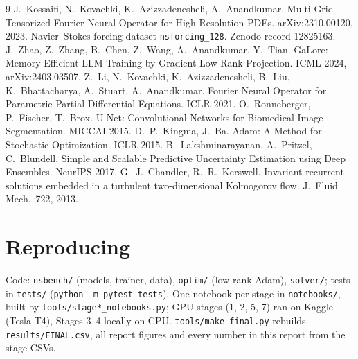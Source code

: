 \documentclass[11pt,a4paper]{article}
\begin{document}
\begin{thebibliography}{9}\small
{} J.~Kossaifi, N.~Kovachki, K.~Azizzadenesheli, A.~Anandkumar. Multi-Grid Tensorized Fourier Neural
Operator for High-Resolution PDEs. arXiv:2310.00120, 2023.
 Navier--Stokes forcing dataset \texttt{nsforcing\_128}. Zenodo record 12825163.
 J.~Zhao, Z.~Zhang, B.~Chen, Z.~Wang, A.~Anandkumar, Y.~Tian. GaLore: Memory-Efficient LLM Training by
Gradient Low-Rank Projection. ICML 2024, arXiv:2403.03507.
 Z.~Li, N.~Kovachki, K.~Azizzadenesheli, B.~Liu, K.~Bhattacharya, A.~Stuart, A.~Anandkumar. Fourier
Neural Operator for Parametric Partial Differential Equations. ICLR 2021.
 O.~Ronneberger, P.~Fischer, T.~Brox. U-Net: Convolutional Networks for Biomedical Image Segmentation.
MICCAI 2015.
 D.~P.~Kingma, J.~Ba. Adam: A Method for Stochastic Optimization. ICLR 2015.
 B.~Lakshminarayanan, A.~Pritzel, C.~Blundell. Simple and Scalable Predictive Uncertainty Estimation
using Deep Ensembles. NeurIPS 2017.
 G.~J.~Chandler, R.~R.~Kerswell. Invariant recurrent solutions embedded in a turbulent two-dimensional
Kolmogorov flow. J.\ Fluid Mech.\ 722, 2013.
\end{thebibliography}

\appendix
\section{Reproducing}
Code: \texttt{nsbench/} (models, trainer, data), \texttt{optim/} (low-rank Adam), \texttt{solver/}; tests in
\texttt{tests/} (\texttt{python -m pytest tests}). One notebook per stage in \texttt{notebooks/}, built by
\texttt{tools/stage*\_notebooks.py}; GPU stages (1, 2, 5, 7) ran on Kaggle (Tesla T4), Stages 3--4 locally on CPU.
\texttt{tools/make\_final.py} rebuilds \texttt{results/FINAL.csv}, all report figures and every number in this
report from the stage CSVs.
\end{document}
